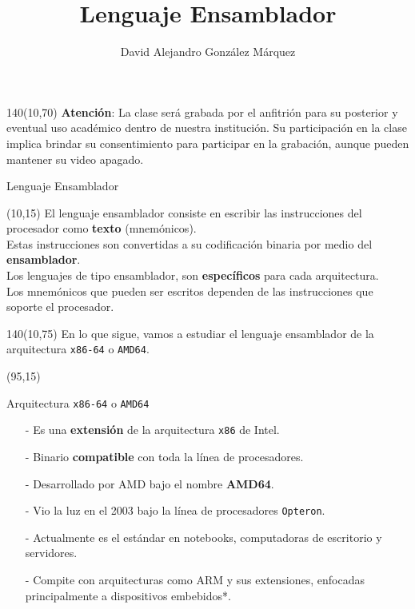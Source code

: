 \documentclass[aspectratio=169]{beamer}
\title{\Huge Lenguaje Ensamblador}
\author{David Alejandro González Márquez}
\date{}
\begin{document}
\begin{frame}[plain]
    \titlepage
    \begin{textblock}{140}(10,70)
    \textcolor{rojo}{
    \textbf{Atención}: La clase será grabada por el anfitrión para su posterior y eventual uso académico dentro de nuestra institución. Su participación en la clase implica brindar su consentimiento para participar en la grabación, aunque pueden mantener su video apagado.}
    \end{textblock}
\end{frame}

\begin{frame}[fragile]{Lenguaje Ensamblador}
    \begin{textblock}{80}(10,15)
    El lenguaje ensamblador consiste en escribir las instrucciones del procesador como \textbf{texto} (mnemónicos).\\
    \bigskip
    Estas instrucciones son convertidas a su codificación binaria por medio del \textbf{ensamblador}.\\
    \bigskip
    Los lenguajes de tipo ensamblador, son \textbf{específicos} para cada arquitectura.\\
    \bigskip
    Los mnemónicos que pueden ser escritos dependen de las instrucciones que soporte el procesador.
    \end{textblock}
    \begin{textblock}{140}(10,75)
    \textcolor{verdeuca}{En lo que sigue, vamos a estudiar el lenguaje ensamblador de la arquitectura \texttt{x86-64} o \texttt{AMD64}.}
    \end{textblock}
    \begin{textblock}{70}(95,15)  \end{textblock}
\end{frame}

\begin{frame}[fragile]{Arquitectura \texttt{x86-64} o \texttt{AMD64}}
    \begin{itemize}
    \setlength\itemsep{0.5cm}
    \item[-] Es una \textbf{extensión} de la arquitectura \texttt{x86} de Intel.
    \item[-] Binario \textbf{compatible} con toda la línea de procesadores.
    \item[-] Desarrollado por AMD bajo el nombre \textbf{AMD64}.
    \item[-] Vio la luz en el 2003 bajo la línea de procesadores \texttt{Opteron}.
    \item[-] Actualmente es el estándar en notebooks, computadoras de escritorio y servidores.
    \item[-] Compite con arquitecturas como ARM y sus extensiones, enfocadas principalmente a dispositivos embebidos*.
    \end{itemize}
\end{frame}
\end{document}
